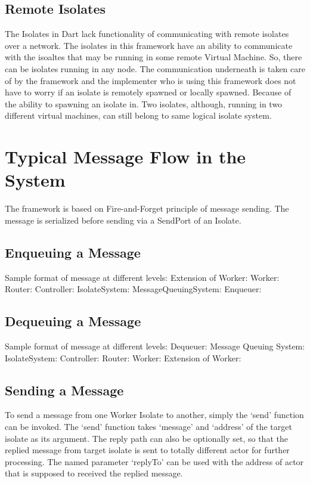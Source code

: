 \subsection{Remote Isolates}
The Isolates in Dart lack functionality of communicating with remote isolates over a network. The isolates in this framework have an ability to communicate with the isoaltes that may be running in some remote Virtual Machine. So, there can be isolates running in any node. The communication underneath is taken care of by the framework and the implementer who is using this framework does not have to worry if an isolate is remotely spawned or locally spawned.
Because of the ability to spawning an isolate in. Two isolates, although, running in two different virtual machines, can still belong to same logical isolate system.

\section{Typical Message Flow in the System}
The framework is based on Fire-and-Forget principle of message sending.
The message is serialized before sending via a SendPort of an Isolate.
\subsection{Enqueuing a Message}
Sample format of message at different levels:
Extension of Worker:
Worker:
Router:
Controller:
IsolateSystem:
MessageQueuingSystem:
Enqueuer:

\subsection{Dequeuing a Message}
Sample format of message at different levels:
Dequeuer:
Message Queuing System:
IsolateSystem:
Controller:
Router:
Worker:
Extension of Worker:

\subsection{Sending a Message}
To send a message from one Worker Isolate to another, simply the ‘send’ function can be invoked. The ‘send’ function takes ‘message’ and ‘address’ of the target isolate as its argument. The reply path can also be optionally set, so that the replied message from target isolate is sent to totally different actor for further processing. The named parameter ‘replyTo’ can be used with the address of actor that is supposed to received the replied message.

